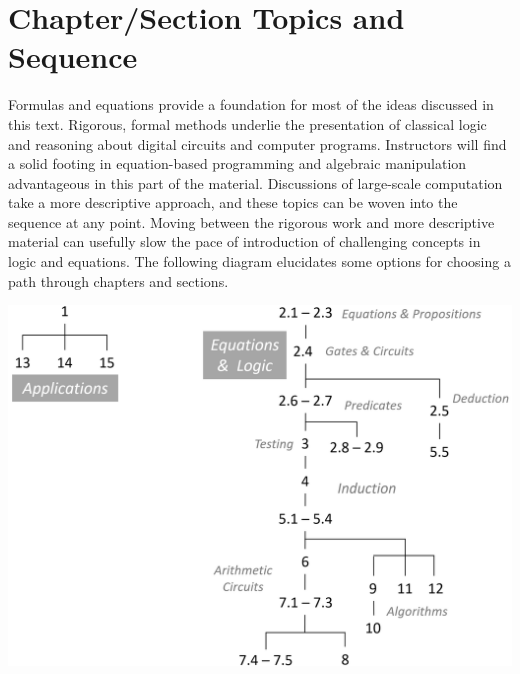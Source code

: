 \chapter{Chapter/Section Topics and Sequence}
\label{ch:roadmap}

Formulas and equations provide a foundation
for most of the ideas discussed in this text.
Rigorous, formal methods underlie the presentation of classical logic
and reasoning about digital circuits and computer programs.
Instructors will find a solid footing in equation-based programming
and algebraic manipulation advantageous in this part of the material.
Discussions of large-scale computation take a more descriptive approach,
and these topics can be woven into the sequence at any point.
Moving between the rigorous work and more descriptive material
can usefully slow the pace of introduction
of challenging concepts in logic and equations.
The following diagram elucidates some options for choosing a
path through chapters and sections.
\vspace{1cm}
\label{diagram:roadmap}
\begin{center}
\includegraphics[scale=0.25]{images/roadmap.png}
\end{center}


